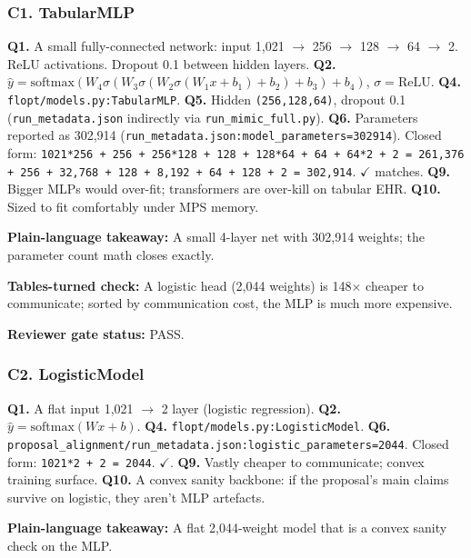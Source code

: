 \documentclass{article}
\begin{document}
\subsubsection{C1. TabularMLP}


\textbf{Q1.} A small fully-connected network: input 1,021 \ensuremath{\rightarrow} 256 \ensuremath{\rightarrow} 128 \ensuremath{\rightarrow} 64 \ensuremath{\rightarrow} 2. ReLU activations. Dropout 0.1 between hidden layers. \textbf{Q2.} \(\hat{y} = \text{softmax}(W_4 \sigma(W_3 \sigma(W_2 \sigma(W_1 x + b_1) + b_2) + b_3) + b_4)\), \(\sigma = \text{ReLU}\). \textbf{Q4.} \texttt{flopt/models.py:TabularMLP}. \textbf{Q5.} Hidden \texttt{(256,128,64)}, dropout 0.1 (\texttt{run\_metadata.json} indirectly via \texttt{run\_mimic\_full.py}). \textbf{Q6.} Parameters reported as 302,914 (\texttt{run\_metadata.json:model\_parameters=302914}). Closed form: \texttt{1021*256 + 256 + 256*128 + 128 + 128*64 + 64 + 64*2 + 2 = 261,376 + 256 + 32,768 + 128 + 8,192 + 64 + 128 + 2 = 302,914}. \ensuremath{\checkmark} matches. \textbf{Q9.} Bigger MLPs would over-fit; transformers are over-kill on tabular EHR. \textbf{Q10.} Sized to fit comfortably under MPS memory.


\textbf{Plain-language takeaway:} A small 4-layer net with 302,914 weights; the parameter count math closes exactly.


\textbf{Tables-turned check:} A logistic head (2,044 weights) is 148\ensuremath{\times} cheaper to communicate; sorted by communication cost, the MLP is much more expensive.


\textbf{Reviewer gate status:} PASS.


\subsubsection{C2. LogisticModel}


\textbf{Q1.} A flat input 1,021 \ensuremath{\rightarrow} 2 layer (logistic regression). \textbf{Q2.} \(\hat{y} = \text{softmax}(Wx + b)\). \textbf{Q4.} \texttt{flopt/models.py:LogisticModel}. \textbf{Q6.} \texttt{proposal\_alignment/run\_metadata.json:logistic\_parameters=2044}. Closed form: \texttt{1021*2 + 2 = 2044}. \ensuremath{\checkmark}. \textbf{Q9.} Vastly cheaper to communicate; convex training surface. \textbf{Q10.} A convex sanity backbone: if the proposal's main claims survive on logistic, they aren't MLP artefacts.


\textbf{Plain-language takeaway:} A flat 2,044-weight model that is a convex sanity check on the MLP.
\end{document}

